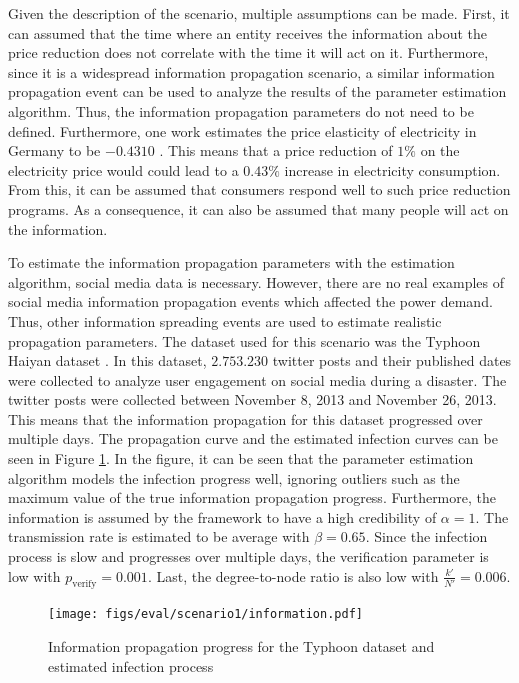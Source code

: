 Given the description of the scenario, multiple assumptions can be made.
First, it can assumed that the time where an entity receives the information
about the price reduction does not correlate with the time it will act on
it. Furthermore, since it is a widespread information propagation scenario,
a similar information propagation event can be used to analyze the 
results of the parameter estimation algorithm. Thus, the information propagation
parameters do not need to be defined. Furthermore, one work estimates 
the price elasticity of electricity in Germany to be $-0.4310$
\cite{priceelasticity}. 
This means that a price reduction of $1\%$
on the electricity price would could lead to a $0.43\%$ increase in
electricity consumption. From this, it can be assumed that consumers 
respond well to such price reduction programs. As a consequence, it 
can also be assumed that many people will act on the information.

To estimate the information propagation parameters with the estimation 
algorithm, social media data is necessary. However, there are no real examples
of social media information propagation events which affected the power demand.
Thus, other information spreading events are used to estimate 
realistic propagation parameters. The dataset used for this scenario
was the Typhoon Haiyan dataset \cite{david2016tweeting}. In this
dataset, $2.753.230$ twitter posts and their published dates were collected
to analyze user engagement on social media during a disaster. 
The twitter posts were collected
between November 8, 2013 and November 26, 2013. This means that the 
information propagation for this dataset progressed over multiple days.
The propagation curve and the estimated infection curves can be seen in 
Figure \ref{propagationestimationtyphoon}. In the figure, it can be seen 
that the parameter estimation algorithm models the infection progress
well, ignoring outliers such as the maximum value of the true information
propagation progress. Furthermore, the
information is assumed by the framework to have a high credibility 
of $\alpha=1$. The transmission rate is estimated to be average with 
$\beta=0.65$.
Since the infection process is slow and progresses over 
multiple days, the verification parameter is
low with $p_{\mathrm{verify}}=0.001$. Last, the degree-to-node ratio
is also low with $\frac{k'}{N'}=0.006$.


\begin{figure}[!ht]
    \center
    \texttt{[image: figs/eval/scenario1/information.pdf]}
    \caption{Information propagation progress for the Typhoon dataset 
    and estimated infection process}
    \label{propagationestimationtyphoon}
\end{figure}

